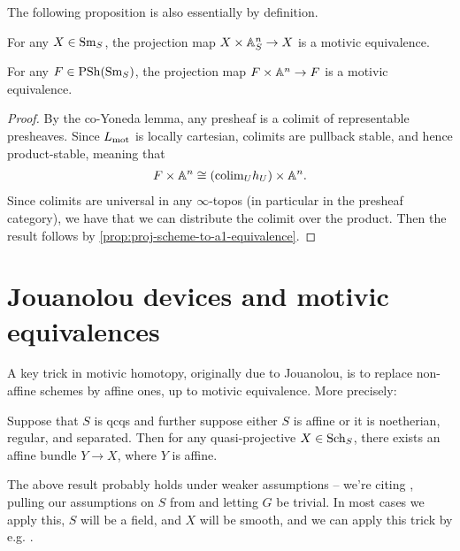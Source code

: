 \documentclass[11pt,openany]{book}
\renewcommand{\Pre}{\mathrm{PSh}}
\begin{document}
The following proposition is also essentially by definition.

\begin{proposition}\label{prop:proj-scheme-to-a1-equivalence} 
For any $X\in \mathrm{Sm}_S$, the projection map $X \times \mathbb{A}^n_S \to X$ is a motivic equivalence.
\end{proposition}

\begin{proposition} For any $F\in \Pre(\Sm_S)$, the projection map $F \times \mathbb{A}^n \to F$ is a motivic equivalence.
\end{proposition}
\begin{proof} By the co-Yoneda lemma, any presheaf is a colimit of representable presheaves. Since $L_{\mathrm{mot}}$ is locally cartesian, colimits are pullback stable, and hence product-stable, meaning that
\begin{align*}
    F \times \mathbb{A}^n \cong \left(\mathrm{colim}_U h_U\right) \times \mathbb{A}^n.
\end{align*}
Since colimits are universal in any $\infty$-topos (in particular in the presheaf category), we have that we can distribute the colimit over the product. Then the result follows by \autoref{prop:proj-scheme-to-a1-equivalence}.
\end{proof}


\section{Jouanolou devices and motivic equivalences}

A key trick in motivic homotopy, originally due to Jouanolou, is to replace non-affine schemes by affine ones, up to motivic equivalence. More precisely:

\begin{theorem}Suppose that $S$ is qcqs and further suppose either $S$ is affine or it is noetherian, regular, and separated. Then for any quasi-projective $X\in \mathrm{Sch}_S$, there exists an affine bundle $Y \to X$, where $Y$ is affine.
\end{theorem}

\begin{remark} The above result probably holds under weaker assumptions -- we're citing \cite[2.20]{Hoyois6}, pulling our assumptions on $S$ from \cite[2.8]{Hoyois6} and letting $G$ be trivial. In most cases we apply this, $S$ will be a field, and $X$ will be smooth, and we can apply this trick by e.g. \cite[3.3.3]{AF-spheres}.
\end{remark}
\end{document}
